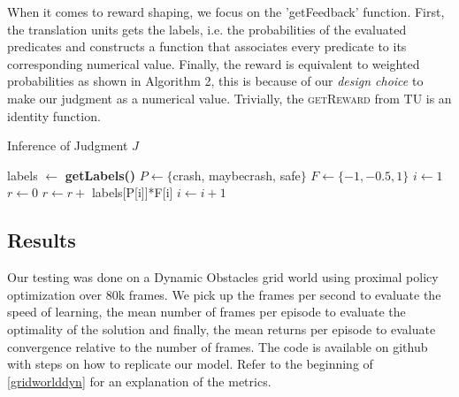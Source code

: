When it comes to reward shaping, we focus on the 'getFeedback' function. First, the translation units gets 
the labels, i.e. the probabilities of the evaluated predicates and constructs a function that associates 
every predicate to its corresponding numerical value. Finally, the reward is equivalent to weighted probabilities 
as shown in Algorithm 2, this is because of our \emph{design choice} to make our judgment as a numerical value. 
Trivially, the \textsc{getReward} from TU is an identity function.

\begin{algorithm}[H]
  \caption{Inference of Judgment $J$}
  \begin{algorithmic}[1]
      
      \State labels $\gets$ \textbf{getLabels()} 
      \State $P \gets \{$crash, maybecrash, safe$\}$  
      \State $F \gets \{-1,-0.5,1\}$ 
      \State $i \gets 1$
      \State $r \gets 0$
         \State $r \gets r +$ labels[P[i]]*F[i] 
         \State $i \gets i+1$


      \EndWhile
      
      \EndProcedure
      
      \end{algorithmic}
      \end{algorithm}

    \subsection{Results}
    Our testing was done on a Dynamic Obstacles grid world using proximal policy optimization over 80k frames. 
    We pick up the frames per second to evaluate the speed of learning, the mean number of frames per episode 
    to evaluate the optimality of the solution and finally, the mean returns per episode to evaluate convergence relative 
    to the number of frames. The code is available on github \cite{dio} with steps on how to replicate our model. 
    Refer to the beginning of \ref{gridworlddyn} for an explanation of the metrics. 


